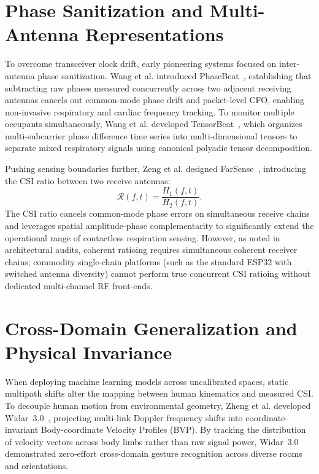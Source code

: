 \section{Phase Sanitization and Multi-Antenna Representations}
To overcome transceiver clock drift, early pioneering systems focused on inter-antenna phase sanitization. Wang et al. introduced PhaseBeat~\cite{author2020on}, establishing that subtracting raw phases measured concurrently across two adjacent receiving antennas cancels out common-mode phase drift and packet-level CFO, enabling non-invasive respiratory and cardiac frequency tracking. To monitor multiple occupants simultaneously, Wang et al. developed TensorBeat~\cite{author2017tensorbeat}, which organizes multi-subcarrier phase difference time series into multi-dimensional tensors to separate mixed respiratory signals using canonical polyadic tensor decomposition.

Pushing sensing boundaries further, Zeng et al. designed FarSense~\cite{author2019farsense}, introducing the CSI ratio between two receive antennas:
\begin{equation}
    \mathcal{R}(f, t) = \frac{H_1(f, t)}{H_2(f, t)}.
\end{equation}
The CSI ratio cancels common-mode phase errors on simultaneous receive chains and leverages spatial amplitude-phase complementarity to significantly extend the operational range of contactless respiration sensing. However, as noted in architectural audits, coherent ratioing requires simultaneous coherent receiver chains; commodity single-chain platforms (such as the standard ESP32 with switched antenna diversity) cannot perform true concurrent CSI ratioing without dedicated multi-channel RF front-ends.

\section{Cross-Domain Generalization and Physical Invariance}
When deploying machine learning models across uncalibrated spaces, static multipath shifts alter the mapping between human kinematics and measured CSI. To decouple human motion from environmental geometry, Zheng et al. developed Widar~3.0~\cite{author2019zeroeffort}, projecting multi-link Doppler frequency shifts into coordinate-invariant Body-coordinate Velocity Profiles (BVP). By tracking the distribution of velocity vectors across body limbs rather than raw signal power, Widar~3.0 demonstrated zero-effort cross-domain gesture recognition across diverse rooms and orientations.

